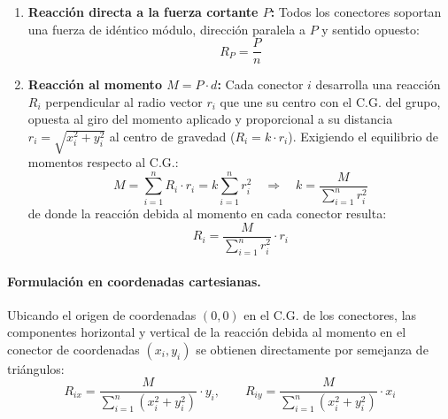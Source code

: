 \begin{enumerate}
    \item \textbf{Reacción directa a la fuerza cortante $P$:} Todos los conectores soportan una fuerza de idéntico módulo, dirección paralela a $P$ y sentido opuesto:
          \begin{equation}
              R_P = \frac{P}{n}
              \label{eq:t8_reaccion_directa}
          \end{equation}
    \item \textbf{Reacción al momento $M = P\cdot d$:} Cada conector $i$ desarrolla una reacción $R_i$ perpendicular al radio vector $r_i$ que une su centro con el C.G. del grupo, opuesta al giro del momento aplicado y proporcional a su distancia $r_i = \sqrt{x_i^2 + y_i^2}$ al centro de gravedad ($R_i = k\cdot r_i$). Exigiendo el equilibrio de momentos respecto al C.G.:
          \begin{equation*}
              M = \sum_{i=1}^{n} R_i \cdot r_i = k \sum_{i=1}^{n} r_i^2 \quad \Longrightarrow \quad k = \frac{M}{\sum_{i=1}^{n} r_i^2}
          \end{equation*}
          de donde la reacción debida al momento en cada conector resulta:
          \begin{equation}
              R_i = \frac{M}{\sum_{i=1}^{n} r_i^2}\cdot r_i
              \label{eq:t8_reaccion_momento}
          \end{equation}
\end{enumerate}

\paragraph{Formulación en coordenadas cartesianas.}
Ubicando el origen de coordenadas $(0,0)$ en el C.G. de los conectores, las componentes horizontal y vertical de la reacción debida al momento en el conector de coordenadas $(x_i, y_i)$ se obtienen directamente por semejanza de triángulos:
\begin{equation}
    R_{ix} = \frac{M}{\sum_{i=1}^{n}(x_i^2 + y_i^2)} \cdot y_i, \qquad R_{iy} = \frac{M}{\sum_{i=1}^{n}(x_i^2 + y_i^2)} \cdot x_i
    \label{eq:t8_cartesianas_exc}
\end{equation}

